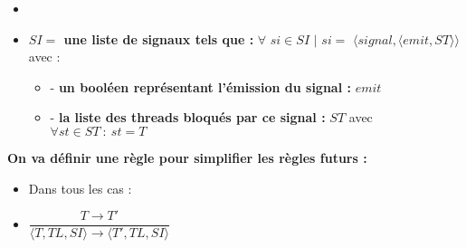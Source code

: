 \documentclass[10pt,a4paper]{article}
\begin{document}
\begin{itemize}
\begin{itemize}
\begin{itemize}
\begin{itemize}
							\end{itemize}
						\end{itemize}	
					\end{itemize}
					\item[]
					\item[] \textbf{$SI =$ une liste de signaux tels que :} $\forall$ $si \in SI$ $|$ $si =$ $\langle signal,\langle emit,ST\rangle\rangle$ avec :
					\begin{itemize}
						\item[] - \textbf{un booléen représentant l'émission du signal :} $emit$
						\item[] - \textbf{la liste des threads bloqués par ce signal :} $ST$ avec $\forall st \in ST~:~st = T$
					\end{itemize}
				\end{itemize}
				\bigbreak
				\bigbreak
					
			
			
			
				\textbf{On va définir une règle pour simplifier les règles futurs :} 
				\begin{itemize}
					\item[] Dans tous les cas :
					\item[] \begin{center}
						$\dfrac{T \rightarrow T'}{\langle T,TL,SI\rangle \rightarrow \langle T',TL,SI\rangle}$
					\end{center}
				\end{itemize}
				\bigbreak
				\bigbreak
					
					
					
\end{document}
